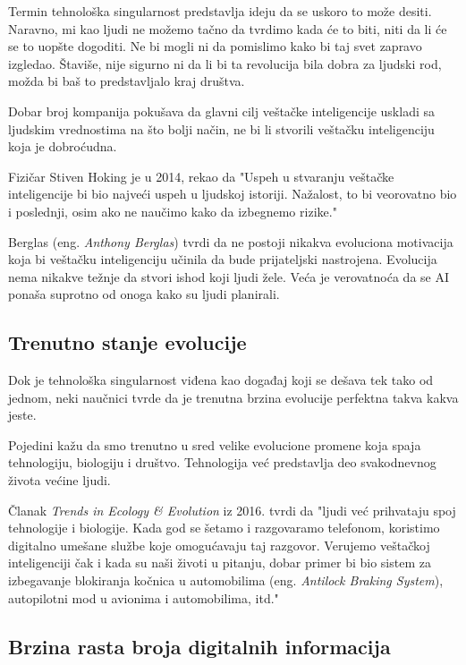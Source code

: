 \documentclass[a4paper]{article}
\begin{document}
Termin tehnološka singularnost predstavlja ideju da se uskoro to može desiti. Naravno, mi kao ljudi ne možemo tačno da tvrdimo kada će to biti, niti da li će se to uopšte dogoditi. Ne bi mogli ni da pomislimo kako bi taj svet zapravo izgledao. Štaviše, nije sigurno ni da li bi ta revolucija bila dobra za ljudski rod, možda bi baš to predstavljalo kraj društva.

Dobar broj kompanija pokušava da glavni cilj veštačke inteligencije uskladi sa ljudskim vrednostima na što bolji način, ne bi li stvorili veštačku inteligenciju koja je dobroćudna.

Fizičar Stiven Hoking je u 2014, rekao da "Uspeh u stvaranju veštačke inteligencije bi bio najveći uspeh u ljudskoj istoriji. Nažalost, to bi veorovatno bio i poslednji, osim ako ne naučimo kako da izbegnemo rizike\cite{ref14}."

Berglas (eng. \textit{Anthony Berglas}) tvrdi da ne postoji nikakva evoluciona motivacija koja bi veštačku inteligenciju učinila da bude prijateljski nastrojena. Evolucija nema nikakve težnje da stvori ishod koji ljudi žele. Veća je verovatnoća da se AI ponaša suprotno od onoga kako su ljudi planirali.

\subsection{Trenutno stanje evolucije}
\label{subsec:sledeći_korak_evolucije}
\hfill

Dok je tehnološka singularnost viđena kao događaj koji se dešava tek tako od jednom, neki naučnici tvrde da je trenutna brzina evolucije perfektna takva kakva jeste.

Pojedini kažu da smo trenutno u sred velike evolucione promene koja spaja tehnologiju, biologiju i društvo. Tehnologija već predstavlja deo svakodnevnog života većine ljudi.

Članak \textit{Trends in Ecology \& Evolution}\cite{ref15} iz 2016. tvrdi da "ljudi već prihvataju spoj tehnologije i biologije. Kada god se šetamo i razgovaramo telefonom, koristimo digitalno umešane službe koje omogućavaju taj razgovor. Verujemo veštačkoj inteligenciji čak i kada su naši životi u pitanju, dobar primer bi bio sistem za izbegavanje blokiranja kočnica u automobilima (eng. \textit{Antilock Braking System}), autopilotni mod u avionima i automobilima, itd."

\subsection{Brzina rasta broja digitalnih informacija}
\label{subsec:broj_digitalnih_informacija_}
\end{document}
